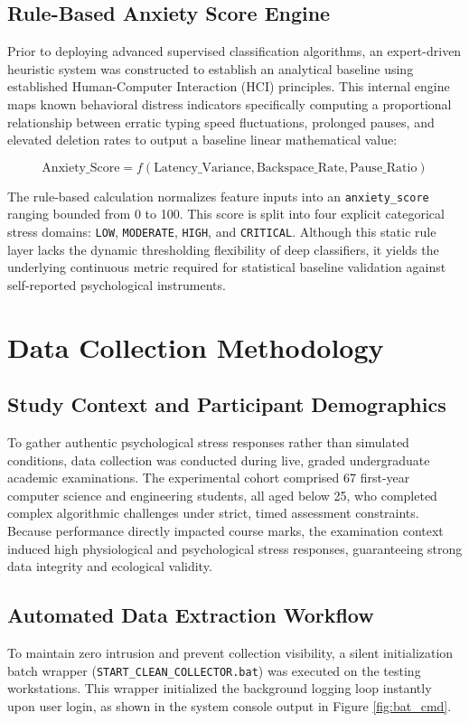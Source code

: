 \subsection{Rule-Based Anxiety Score Engine}
Prior to deploying advanced supervised classification algorithms, an expert-driven heuristic system was constructed to establish an analytical baseline using established Human-Computer Interaction (HCI) principles. This internal engine maps known behavioral distress indicators specifically computing a proportional relationship between erratic typing speed fluctuations, prolonged pauses, and elevated deletion rates to output a baseline linear mathematical value:

\begin{equation}
\text{Anxiety\_Score} = f(\text{Latency\_Variance}, \text{Backspace\_Rate}, \text{Pause\_Ratio})
\end{equation}

\noindent The rule-based calculation normalizes feature inputs into an \texttt{anxiety\_score} ranging bounded from 0 to 100. This score is split into four explicit categorical stress domains: \texttt{LOW}, \texttt{MODERATE}, \texttt{HIGH}, and \texttt{CRITICAL}. Although this static rule layer lacks the dynamic thresholding flexibility of deep classifiers, it yields the underlying continuous metric required for statistical baseline validation against self-reported psychological instruments.

\section{Data Collection Methodology}

\subsection{Study Context and Participant Demographics}
To gather authentic psychological stress responses rather than simulated conditions, data collection was conducted during live, graded undergraduate academic examinations. The experimental cohort comprised 67 first-year computer science and engineering students, all aged below 25, who completed complex algorithmic challenges under strict, timed assessment constraints. Because performance directly impacted course marks, the examination context induced high physiological and psychological stress responses, guaranteeing strong data integrity and ecological validity.

\subsection{Automated Data Extraction Workflow}
To maintain zero intrusion and prevent collection visibility, a silent initialization batch wrapper (\texttt{START\_CLEAN\_COLLECTOR.bat}) was executed on the testing workstations. This wrapper initialized the background logging loop instantly upon user login, as shown in the system console output in Figure \ref{fig:bat_cmd}.

